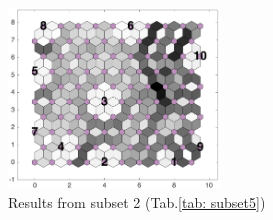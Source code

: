 \begin{figure}
        \centering
        \includegraphics[width=0.5\textwidth]{../../images0.01/M31/2D/image_subsets/subset5_dist_with_hits_t.png}
    \caption{Results from subset 2 (Tab.\ref{tab: subset5})}
    \label{fig: subset5}
\end{figure}